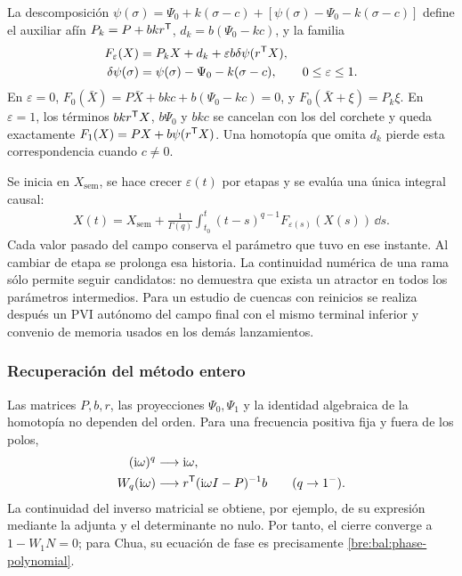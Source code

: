 La descomposición
\(\psi(\sigma)=\Psi_0+k(\sigma-c)
+[\psi(\sigma)-\Psi_0-k(\sigma-c)]\) define el auxiliar afín
\(P_k=P+bkr^{\mathsf T}\), \(d_k=b(\Psi_0-kc)\), y la familia
\begin{equation}
 \begin{aligned}
 F_\varepsilon(X)&=P_kX+d_k+\varepsilon b\delta\psi(r^{\mathsf T}X),\\
 \delta\psi(\sigma)&=\psi(\sigma)-\Psi_0-k(\sigma-c),
 \qquad 0\leq\varepsilon\leq1.
 \end{aligned}
 \label{bre:bal:homotopy}
\end{equation}
En \(\varepsilon=0\),
\(F_0(\bar X)=P\bar X+bk c+b(\Psi_0-kc)=0\), y
\(F_0(\bar X+\xi)=P_k\xi\). En \(\varepsilon=1\), los términos
\(bk r^{\mathsf T}X\), \(b\Psi_0\) y \(bkc\) se cancelan con los del
corchete y queda exactamente \(F_1(X)=PX+b\psi(r^{\mathsf T}X)\).
Una homotopía que omita \(d_k\) pierde esta correspondencia cuando
\(c\ne0\).

Se inicia en \(X_{\mathrm{sem}}\), se hace crecer
\(\varepsilon(t)\) por etapas y se evalúa una única integral causal:
\begin{equation}
 \begin{aligned}
 X(t)=X_{\mathrm{sem}}+\frac1{\Gamma(q)}
 \int_{t_0}^t(t-s)^{q-1}F_{\varepsilon(s)}(X(s))\,\dd s.
 \end{aligned}
 \label{bre:bal:causal-continuation}
\end{equation}
Cada valor pasado del campo conserva el parámetro que tuvo en ese
instante. Al cambiar de etapa se prolonga esa historia. La continuidad
numérica de una rama sólo permite seguir candidatos: no demuestra que
exista un atractor en todos los parámetros intermedios. Para un estudio
de cuencas con reinicios se realiza después un PVI autónomo del campo
final con el mismo terminal inferior y convenio de memoria usados en
los demás lanzamientos.

\subsubsection{Recuperación del método entero}
Las matrices \(P,b,r\), las proyecciones \(\Psi_0,\Psi_1\) y
la identidad algebraica de la homotopía no dependen del orden. Para
una frecuencia positiva fija y fuera de los polos,
\begin{equation}
 \begin{aligned}
 (\mathrm i\omega)^q&\longrightarrow\mathrm i\omega,\\
 W_q(\mathrm i\omega)&\longrightarrow r^{\mathsf T}(\mathrm i\omega I-P)^{-1}b
 \qquad(q\to1^-).
 \end{aligned}
 \label{bre:bal:integer-limit}
\end{equation}
La continuidad del inverso matricial se obtiene, por ejemplo, de su
expresión mediante la adjunta y el determinante no nulo. Por tanto,
el cierre converge a \(1-W_1N=0\); para Chua, su ecuación de fase
es precisamente \eqref{bre:bal:phase-polynomial}.

